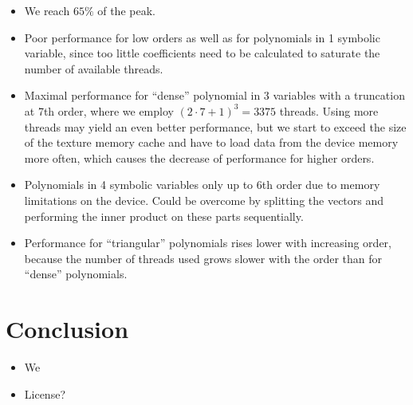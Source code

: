 \documentclass[oribibl]{llncs2e/llncs}
\begin{document}
\begin{itemize}
\item We reach $65\%$ of the peak.
\item Poor performance for low orders as well as for polynomials in 1 symbolic variable, since too little coefficients need to be calculated to saturate the number of available threads.
\item Maximal performance for ``dense'' polynomial in 3 variables with a truncation at 7th order, where we employ $(2\cdot7+1)^3 = 3375$ threads. Using more threads may yield an even better performance, but we start to exceed the size of the texture memory cache and have to load data from the device memory more often, which causes the decrease of performance for higher orders.
\item Polynomials in 4 symbolic variables only up to 6th order due to memory limitations on the device. Could be overcome by splitting the vectors and performing the inner product on these parts sequentially.
\item Performance for ``triangular'' polynomials rises lower with increasing order, because the number of threads used grows slower with the order than for ``dense'' polynomials.
\end{itemize}


\section{Conclusion}
\begin{itemize}
\item We 
\item License?
\end{itemize}



\end{document}
